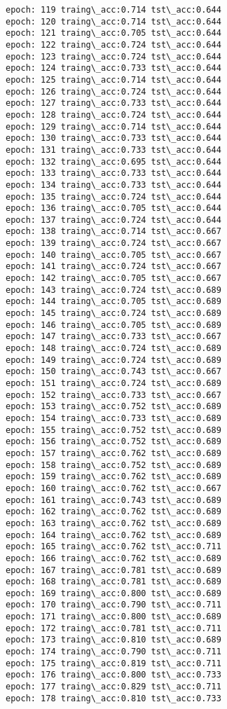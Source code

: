 \documentclass[11pt]{article}
\begin{document}
\begin{Verbatim}[commandchars=\\\{\}]
epoch: 119 traing\_acc:0.714 tst\_acc:0.644
epoch: 120 traing\_acc:0.714 tst\_acc:0.644
epoch: 121 traing\_acc:0.705 tst\_acc:0.644
epoch: 122 traing\_acc:0.724 tst\_acc:0.644
epoch: 123 traing\_acc:0.724 tst\_acc:0.644
epoch: 124 traing\_acc:0.733 tst\_acc:0.644
epoch: 125 traing\_acc:0.714 tst\_acc:0.644
epoch: 126 traing\_acc:0.724 tst\_acc:0.644
epoch: 127 traing\_acc:0.733 tst\_acc:0.644
epoch: 128 traing\_acc:0.724 tst\_acc:0.644
epoch: 129 traing\_acc:0.714 tst\_acc:0.644
epoch: 130 traing\_acc:0.733 tst\_acc:0.644
epoch: 131 traing\_acc:0.733 tst\_acc:0.644
epoch: 132 traing\_acc:0.695 tst\_acc:0.644
epoch: 133 traing\_acc:0.733 tst\_acc:0.644
epoch: 134 traing\_acc:0.733 tst\_acc:0.644
epoch: 135 traing\_acc:0.724 tst\_acc:0.644
epoch: 136 traing\_acc:0.705 tst\_acc:0.644
epoch: 137 traing\_acc:0.724 tst\_acc:0.644
epoch: 138 traing\_acc:0.714 tst\_acc:0.667
epoch: 139 traing\_acc:0.724 tst\_acc:0.667
epoch: 140 traing\_acc:0.705 tst\_acc:0.667
epoch: 141 traing\_acc:0.724 tst\_acc:0.667
epoch: 142 traing\_acc:0.705 tst\_acc:0.667
epoch: 143 traing\_acc:0.724 tst\_acc:0.689
epoch: 144 traing\_acc:0.705 tst\_acc:0.689
epoch: 145 traing\_acc:0.724 tst\_acc:0.689
epoch: 146 traing\_acc:0.705 tst\_acc:0.689
epoch: 147 traing\_acc:0.733 tst\_acc:0.667
epoch: 148 traing\_acc:0.724 tst\_acc:0.689
epoch: 149 traing\_acc:0.724 tst\_acc:0.689
epoch: 150 traing\_acc:0.743 tst\_acc:0.667
epoch: 151 traing\_acc:0.724 tst\_acc:0.689
epoch: 152 traing\_acc:0.733 tst\_acc:0.667
epoch: 153 traing\_acc:0.752 tst\_acc:0.689
epoch: 154 traing\_acc:0.733 tst\_acc:0.689
epoch: 155 traing\_acc:0.752 tst\_acc:0.689
epoch: 156 traing\_acc:0.752 tst\_acc:0.689
epoch: 157 traing\_acc:0.762 tst\_acc:0.689
epoch: 158 traing\_acc:0.752 tst\_acc:0.689
epoch: 159 traing\_acc:0.762 tst\_acc:0.689
epoch: 160 traing\_acc:0.762 tst\_acc:0.667
epoch: 161 traing\_acc:0.743 tst\_acc:0.689
epoch: 162 traing\_acc:0.762 tst\_acc:0.689
epoch: 163 traing\_acc:0.762 tst\_acc:0.689
epoch: 164 traing\_acc:0.762 tst\_acc:0.689
epoch: 165 traing\_acc:0.762 tst\_acc:0.711
epoch: 166 traing\_acc:0.762 tst\_acc:0.689
epoch: 167 traing\_acc:0.781 tst\_acc:0.689
epoch: 168 traing\_acc:0.781 tst\_acc:0.689
epoch: 169 traing\_acc:0.800 tst\_acc:0.689
epoch: 170 traing\_acc:0.790 tst\_acc:0.711
epoch: 171 traing\_acc:0.800 tst\_acc:0.689
epoch: 172 traing\_acc:0.781 tst\_acc:0.711
epoch: 173 traing\_acc:0.810 tst\_acc:0.689
epoch: 174 traing\_acc:0.790 tst\_acc:0.711
epoch: 175 traing\_acc:0.819 tst\_acc:0.711
epoch: 176 traing\_acc:0.800 tst\_acc:0.733
epoch: 177 traing\_acc:0.829 tst\_acc:0.711
epoch: 178 traing\_acc:0.810 tst\_acc:0.733

\end{Verbatim}
\end{document}
